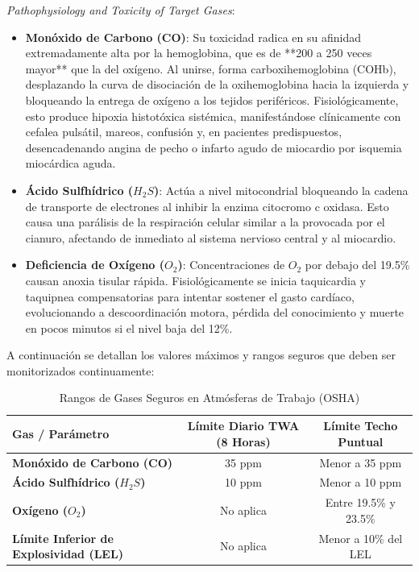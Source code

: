 \documentclass[11pt, letterpaper]{article}
\begin{document}
\textit{Pathophysiology and Toxicity of Target Gases}:
\begin{itemize}
    \item \textbf{Monóxido de Carbono (CO)}: Su toxicidad radica en su afinidad extremadamente alta por la hemoglobina, que es de **200 a 250 veces mayor** que la del oxígeno. Al unirse, forma carboxihemoglobina (COHb), desplazando la curva de disociación de la oxihemoglobina hacia la izquierda y bloqueando la entrega de oxígeno a los tejidos periféricos. Fisiológicamente, esto produce hipoxia histotóxica sistémica, manifestándose clínicamente con cefalea pulsátil, mareos, confusión y, en pacientes predispuestos, desencadenando angina de pecho o infarto agudo de miocardio por isquemia miocárdica aguda.
    \item \textbf{Ácido Sulfhídrico ($H_2S$)}: Actúa a nivel mitocondrial bloqueando la cadena de transporte de electrones al inhibir la enzima citocromo c oxidasa. Esto causa una parálisis de la respiración celular similar a la provocada por el cianuro, afectando de inmediato al sistema nervioso central y al miocardio.
    \item \textbf{Deficiencia de Oxígeno ($O_2$)}: Concentraciones de $O_2$ por debajo del 19.5\% causan anoxia tisular rápida. Fisiológicamente se inicia taquicardia y taquipnea compensatorias para intentar sostener el gasto cardíaco, evolucionando a descoordinación motora, pérdida del conocimiento y muerte en pocos minutos si el nivel baja del 12\%.
\end{itemize}

A continuación se detallan los valores máximos y rangos seguros que deben ser monitorizados continuamente:

\begin{table}[H]
    \centering
    \small
    \caption{Rangos de Gases Seguros en Atmósferas de Trabajo (OSHA)}
    \begin{tabular}{lcc}
        \toprule
        \textbf{Gas / Parámetro} & \textbf{Límite Diario TWA (8 Horas)} & \textbf{Límite Techo Puntual} \\
        \midrule
        \textbf{Monóxido de Carbono (CO)} & 35 ppm & Menor a 35 ppm \\
        \textbf{Ácido Sulfhídrico ($H_2S$)} & 10 ppm & Menor a 10 ppm \\
        \textbf{Oxígeno ($O_2$)} & No aplica & Entre 19.5\% y 23.5\% \\
        \textbf{Límite Inferior de Explosividad (LEL)} & No aplica & Menor a 10\% del LEL \\
        \bottomrule
    \end{tabular}
\end{table}
\end{document}
